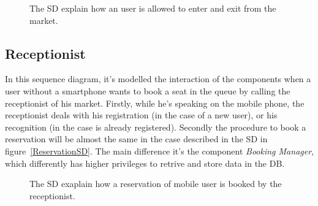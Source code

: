 \begin{figure}[H]
  \label{EntryExitSD}
  \centering
    \caption{The SD explain how an user is allowed to enter and exit from the market.}
\end{figure} 

\subsection{Receptionist}
In this sequence diagram, it's modelled the interaction of the components when a user without a smartphone wants to book a seat in the queue by calling the receptionist of his market. Firstly, while he's speaking on the mobile phone, the receptionist deals with his registration (in the case of a new user), or his recognition (in the case is already registered).
Secondly the procedure to book a reservation will be almost the same in the case described in the SD in figure~\ref{ReservationSD}. The main difference it's the component \textit{Booking Manager}, which differently has higher privileges to retrive and store data in the DB.

\begin{figure}[H]
  \label{MobileUserSD}
  \centering
    \caption{The SD exaplain how a reservation of mobile user is booked by the receptionist.}
\end{figure} 

